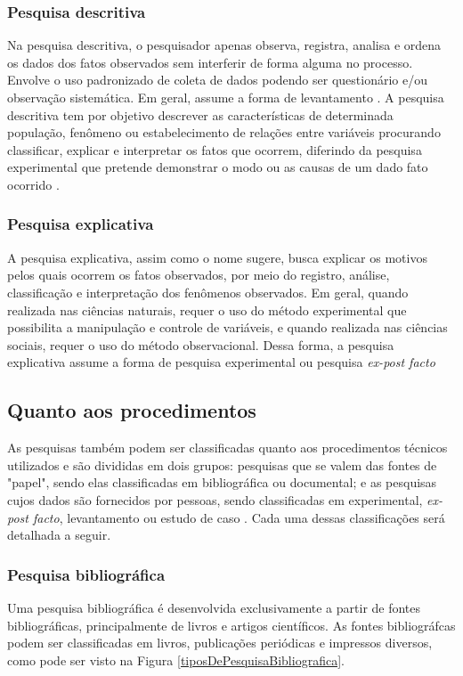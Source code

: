 \subsubsection{Pesquisa descritiva}
	Na pesquisa descritiva, o pesquisador apenas observa, registra, analisa e ordena os dados dos fatos observados sem interferir de forma alguma no processo. Envolve o uso padronizado de coleta de dados podendo ser questionário e/ou observação sistemática. Em geral, assume a forma de levantamento \cite{ac2002elaborar}. 
A pesquisa descritiva tem por objetivo descrever as características de determinada população, fenômeno ou estabelecimento de relações entre variáveis procurando classificar, explicar e interpretar os fatos que ocorrem, diferindo da pesquisa experimental que pretende demonstrar o modo ou as causas de um dado fato ocorrido \cite{prodanov2013metodologia}.
\subsubsection{Pesquisa explicativa}
	A pesquisa explicativa, assim como o nome sugere, busca explicar os motivos pelos quais ocorrem os fatos observados, por meio do registro, análise, classificação e interpretação dos fenômenos observados. 
Em geral, quando realizada nas ciências naturais, requer o uso do método experimental que possibilita a manipulação e controle de variáveis, e quando realizada nas ciências sociais, requer o uso do método observacional. Dessa forma, a pesquisa explicativa assume a forma de pesquisa experimental ou pesquisa \textit{ex-post facto} \cite{prodanov2013metodologia}

\subsection{Quanto aos procedimentos}
	As pesquisas também podem ser classificadas quanto aos procedimentos técnicos utilizados e são divididas em dois grupos: pesquisas que se valem das fontes de "papel", sendo elas classificadas em bibliográfica ou documental; e as pesquisas cujos dados são fornecidos por pessoas, sendo classificadas em experimental, \textit{ex-post facto}, levantamento ou estudo de caso \cite{ac2002elaborar}. Cada uma dessas classificações será detalhada a seguir.

\subsubsection{Pesquisa bibliográfica} 
	Uma pesquisa bibliográfica é desenvolvida exclusivamente a partir de fontes bibliográficas, principalmente de livros e artigos científicos. As fontes bibliográfcas podem ser classificadas em livros, publicações periódicas e impressos diversos, como pode ser visto na Figura \ref{tiposDePesquisaBibliografica}.

